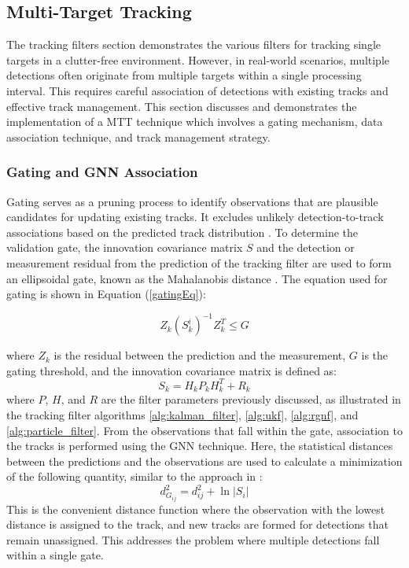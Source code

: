 
\subsection{Multi-Target Tracking}
The tracking filters section demonstrates the various filters for tracking single targets in a clutter-free environment. However, in real-world scenarios, multiple detections often originate from multiple targets within a single processing interval. This requires careful association of detections with existing tracks and effective track management. This section discusses and demonstrates the implementation of a \ac{MTT} technique which involves a gating mechanism, data association technique, and track management strategy.

\subsubsection{Gating and \ac{GNN} Association}
Gating serves as a pruning process to identify observations that are plausible candidates for updating existing tracks. It excludes unlikely detection-to-track associations based on the predicted track distribution \cite{Jerrelind2020}. To determine the validation gate, the innovation covariance matrix \(S\) and the detection or measurement residual from the prediction of the tracking filter are used to form an ellipsoidal gate, known as the Mahalanobis distance \cite{Richards2010}. The equation used for gating is shown in Equation (\ref{gatingEq}):

\begin{equation}
    Z_k (S_k^i)^{-1}Z_k^T \le G
    \label{gatingEq}
\end{equation}

where \(Z_k\) is the residual between the prediction and the measurement, \(G\) is the gating threshold, and the innovation covariance matrix is defined as:
\begin{equation}
    S_k = H_k P_k H_k^T + R_k
\end{equation} 
where \(P\), \(H\), and \(R\) are the filter parameters previously discussed, as illustrated in the tracking filter algorithms \ref{alg:kalman_filter}, \ref{alg:ukf}, \ref{alg:rgnf}, and \ref{alg:particle_filter}.
\newline
\newline
From the observations that fall within the gate, association to the tracks is performed using the \ac{GNN} technique. Here, the statistical distances between the predictions and the observations are used to calculate a minimization of the following quantity, similar to the approach in \cite{Konstantinova2003}:
\begin{equation}
    d^2_{G_{ij}} = d^2_{ij} + \ln|S_i|
\end{equation}
This is the convenient distance function where the observation with the lowest distance is assigned to the track, and new tracks are formed for detections that remain unassigned. This addresses the problem where multiple detections fall within a single gate.

